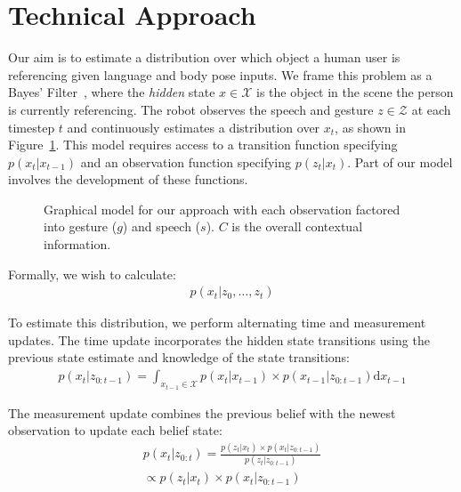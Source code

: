 \documentclass[a4paper, 11pt]{article} %
\begin{document}
\section{Technical Approach}
Our aim is to estimate a distribution over which object a human user is referencing given language and body pose inputs. We frame this problem as a Bayes' Filter~\citep{thrun08}, where the \textit{hidden} state $x \in \mathcal{X}$ is the object in the scene the person is currently referencing. The robot observes the speech and gesture $z \in \mathcal{Z}$ at each timestep $t$ and continuously estimates a distribution over $x_t$, as shown in Figure~\ref{fig:model}. This model requires access to a transition function specifying $p(x_t | x_{t-1})$ and an observation function specifying $p(z_t | x_t)$. Part of our model involves the development of these functions.

\begin{figure}[h]
\centering
{}
\caption{Graphical model for our approach with each observation factored into gesture ($g$) and speech ($s$). $C$ is the overall contextual information.\label{fig:model}}
\end{figure}

Formally, we wish to calculate:
\begin{align}
p(x_t | z_0, \dots, z_t)
\end{align}

To estimate this distribution, we perform alternating time and measurement updates. The time update incorporates the hidden state transitions using the previous state estimate and knowledge of the state transitions:
\begin{align}
p(x_t | z_{0:t-1}) = \int_{x_{t-1} \in \mathcal{X}} p(x_t|x_{t-1})\times p(x_{t-1} | z_{0:t-1}) \text{d}x_{t-1}
\end{align}

The measurement update combines the previous belief with the newest observation to update each belief state: 
\begin{align}
p(x_t |z_{0:t}) = \frac{p(z_t | x_t) \times p(x_t | z_{0:t-1})}{p(z_t | z_{0:t-1})} \\\propto p(z_t | x_t) \times p(x_t | z_{0:t-1})
\end{align}
\end{document}
